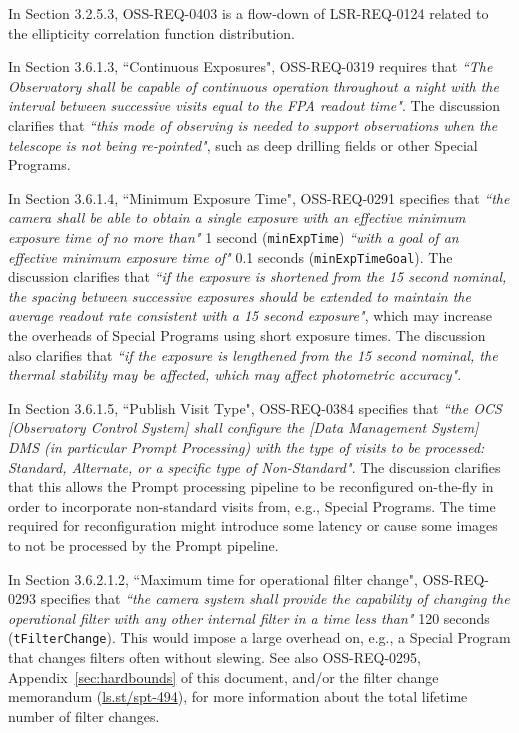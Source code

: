 In Section 3.2.5.3, OSS-REQ-0403 is a flow-down of LSR-REQ-0124 related to the ellipticity correlation function distribution.

In Section 3.6.1.3, ``Continuous Exposures", OSS-REQ-0319 requires that {\it ``The Observatory shall be capable of continuous operation throughout a night with the interval between successive visits equal to the FPA readout time"}.
The discussion clarifies that {\it ``this mode of observing is needed to support observations when the telescope is not being re-pointed"}, such as deep drilling fields or other Special Programs.

In Section 3.6.1.4, ``Minimum Exposure Time", OSS-REQ-0291 specifies that {\it ``the camera shall be able to obtain a single exposure with an effective minimum exposure time of no more than"} 1 second ({\tt minExpTime}) {\it ``with a goal of an effective minimum exposure time of"} 0.1 seconds ({\tt minExpTimeGoal}). 
The discussion clarifies that {\it ``if the exposure is shortened from the 15 second nominal, the spacing between successive exposures should be extended to maintain the average readout rate consistent with a 15 second exposure"}, which may increase the overheads of Special Programs using short exposure times.
The discussion also clarifies that {\it ``if the exposure is lengthened from the 15 second nominal, the thermal stability may be affected, which may affect photometric accuracy"}.

In Section 3.6.1.5, ``Publish Visit Type", OSS-REQ-0384 specifies that {\it ``the OCS [Observatory Control System] shall configure the [Data Management System] DMS (in particular Prompt Processing) with the type of visits to be processed: Standard, Alternate, or a specific type of Non-Standard"}.
The discussion clarifies that this allows the Prompt processing pipeline to be reconfigured on-the-fly in order to incorporate non-standard visits from, e.g., Special Programs.
The time required for reconfiguration might introduce some latency or cause some images to not be processed by the Prompt pipeline.

In Section 3.6.2.1.2, ``Maximum time for operational filter change", OSS-REQ-0293 specifies that {\it ``the camera system shall provide the capability of changing the operational filter with any other internal filter in a time less than"} 120 seconds ({\tt tFilterChange}).
This would impose a large overhead on, e.g., a Special Program that changes filters often without slewing.
See also OSS-REQ-0295, Appendix~\ref{sec:hardbounds} of this document, and/or the filter change memorandum (\url{ls.st/spt-494}), for more information about the total lifetime number of filter changes.

